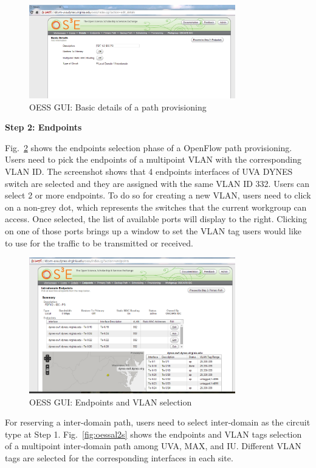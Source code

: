 {\begin{figure}[htb!]
\centering
\includegraphics[width=0.8\textwidth]{figures/oess-basic.png}
\caption{OESS GUI: Basic details of a path provisioning}
\label{fig:oessbasic}
\end{figure}

\textbf{Step 2: Endpoints}

Fig.~\ref{fig:oesspoints} shows the endpoints selection phase of a OpenFlow path provisioning. Users need to pick the endpoints of a multipoint VLAN with the corresponding VLAN ID. The screenshot shows that 4 endpoints interfaces of UVA DYNES switch are selected and they are assigned with the same VLAN ID 332. Users can select 2 or more endpoints.  To do so for creating a new VLAN, users need to click on a non-grey dot, which represents the switches that the current workgroup can access.  Once selected, the list of available ports will display to the right. Clicking on one of those ports brings up a window to set the VLAN tag users would like to use for the traffic to be transmitted or received.

\begin{figure}[htb!]
\centering
\includegraphics[width=0.8\textwidth]{figures/oess-points.png}
\caption{OESS GUI: Endpoints and VLAN selection}
\label{fig:oesspoints}
\end{figure}

For reserving a inter-domain path, users need to select inter-domain as the circuit type at Step 1. Fig.~\ref{fig:oessal2s} shows the endpoints and VLAN tags selection of a multipoint inter-domain path among UVA, MAX, and IU. Different VLAN tags are selected for the corresponding interfaces in each site. 

}
